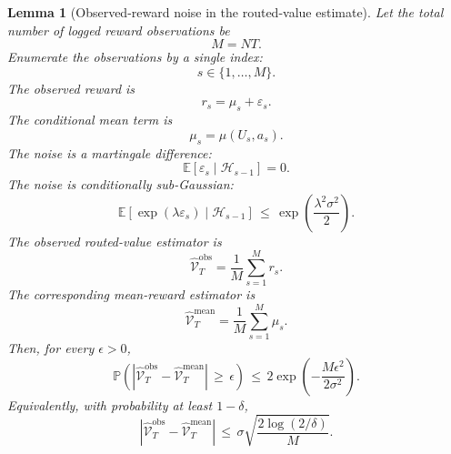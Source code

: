 \documentclass{article} %
\newtheorem{lemma}[theorem]{Lemma}
\begin{document}
\begin{lemma}[Observed-reward noise in the routed-value estimate]
\label{lem:18}
Let the total number of logged reward observations be
\begin{equation}
\label{eq:app-six-noise-M}
M=NT.
\end{equation}
Enumerate the observations by a single index:
\begin{equation}
\label{eq:app-six-noise-index}
s\in\{1,\ldots,M\}.
\end{equation}
The observed reward is
\begin{equation}
\label{eq:app-six-noise-reward}
r_s
=
\mu_s+\varepsilon_s.
\end{equation}
The conditional mean term is
\begin{equation}
\label{eq:app-six-noise-mean}
\mu_s
=
\mu(U_s,a_s).
\end{equation}
The noise is a martingale difference:
\begin{equation}
\label{eq:app-six-noise-mds}
\mathbb{E}[\varepsilon_s\mid \mathcal{H}_{s-1}]
=
0.
\end{equation}
The noise is conditionally sub-Gaussian:
\begin{equation}
\label{eq:app-six-noise-subg}
\mathbb{E}\!\left[
\exp(\lambda\varepsilon_s)
\mid
\mathcal{H}_{s-1}
\right]
\,\le\,
\exp\!\left(\frac{\lambda^2\sigma^2}{2}\right).
\end{equation}
The observed routed-value estimator is
\begin{equation}
\label{eq:app-six-noise-hat-obs}
\widehat{\mathcal{V}}_{T}^{\mathrm{obs}}
=
\frac{1}{M}\sum_{s=1}^{M}r_s.
\end{equation}
The corresponding mean-reward estimator is
\begin{equation}
\label{eq:app-six-noise-hat-mean}
\widehat{\mathcal{V}}_{T}^{\mathrm{mean}}
=
\frac{1}{M}\sum_{s=1}^{M}\mu_s.
\end{equation}
Then, for every \(\epsilon>0\),
\begin{equation}
\label{eq:app-six-noise-tail}
\mathbb{P}\!\left(
\left|
\widehat{\mathcal{V}}_{T}^{\mathrm{obs}}
-
\widehat{\mathcal{V}}_{T}^{\mathrm{mean}}
\right|
\,\ge\,
\epsilon
\right)
\,\le\,
2\exp\!\left(
-\frac{M\epsilon^2}{2\sigma^2}
\right).
\end{equation}
Equivalently, with probability at least \(1-\delta\),
\begin{equation}
\label{eq:app-six-noise-radius}
\left|
\widehat{\mathcal{V}}_{T}^{\mathrm{obs}}
-
\widehat{\mathcal{V}}_{T}^{\mathrm{mean}}
\right|
\,\le\,
\sigma\sqrt{\frac{2\log(2/\delta)}{M}}.
\end{equation}
\end{lemma}
\end{document}
